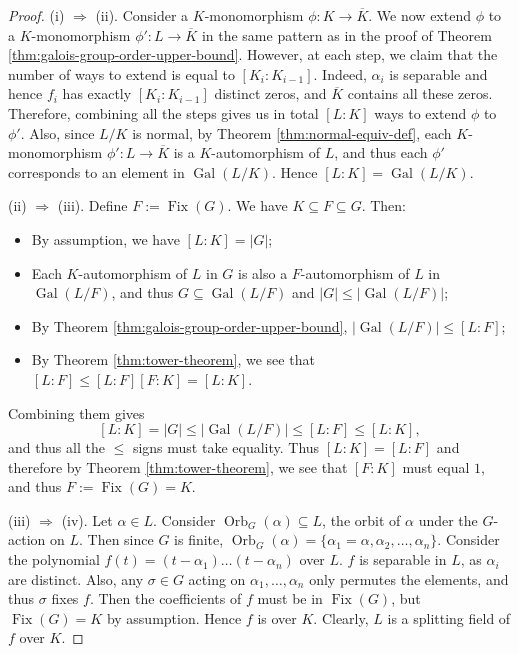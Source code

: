 \documentclass[12pt]{article}
\theoremstyle{definition}
\newcommand{\Gal}{\operatorname{Gal}}
\newcommand{\Fix}{\operatorname{Fix}}
\newcommand{\Orb}{\operatorname{Orb}}
\begin{document}

\begin{proof}
	
	
	
	(i) $\Rightarrow$ (ii). Consider a $K$-monomorphism $\phi: K \to \overline{K}$. We now extend $\phi$ to a $K$-monomorphism $\phi':L \to \overline{K}$ in the same pattern as in the proof of Theorem \ref{thm:galois-group-order-upper-bound}. However, at each step, we claim that the number of ways to extend is equal to $[K_i : K_{i-1}]$. Indeed, $\alpha_i$ is separable and hence $f_i$ has exactly $[K_i : K_{i-1}]$ distinct zeros, and $\overline K$ contains all these zeros. Therefore, combining all the steps gives us in total $[L:K]$ ways to extend $\phi$ to $\phi'$. Also, since $L/K$ is normal, by Theorem \ref{thm:normal-equiv-def}, each $K$-monomorphism $\phi': L \to \overline{K}$ is a $K$-automorphism of $L$, and thus each $\phi'$ corresponds to an element in $\Gal(L/K)$. Hence $[L:K] = \Gal(L/K)$. 
	
	(ii) $\Rightarrow$ (iii). Define $F:= \Fix(G)$. We have $K \subseteq F \subseteq G$. Then:
	\begin{itemize}
		\item By assumption, we have $[L:K] = |G|$;
		\item     Each $K$-automorphism of $L$ in $G$ is also a $F$-automorphism of $L$ in $\Gal(L/F)$, and thus $G \subseteq \Gal(L / F)$ and $|G| \le |\Gal(L / F)|$;
		\item  By Theorem \ref{thm:galois-group-order-upper-bound}, $|\Gal(L/F)| \le [L:F]$;
		
		\item     By Theorem \ref{thm:tower-theorem}, we see that $ [L:F] \le [L:F][F:K] = [L:K]$.
	\end{itemize}
	
	Combining them gives $$
	[L:K] = |G| \le |\Gal(L/F)| \le  [L:F] \le [L:K],
	$$    
	and thus all the $\le$ signs must take equality.  
	Thus $[L:K]=[L:F]$ and therefore by Theorem \ref{thm:tower-theorem}, we see that $[F:K]$ must equal $1$, and thus $F:=\Fix(G) = K$.
	
	(iii) $\Rightarrow$ (iv). Let $\alpha \in L$. Consider $\Orb_G(\alpha) \subseteq L$, the orbit of $\alpha$ under the $G$-action on $L$. Then since $G$ is finite, $\Orb_G(\alpha) = \{ \alpha_1 = \alpha, \alpha_2, \ldots, \alpha_n\}$. Consider the polynomial $f(t) = (t-\alpha_1) \ldots (t-\alpha_n)$ over $L$.  $f$ is separable in $L$, as $\alpha_i$ are distinct. Also, any $\sigma \in G$ acting on $\alpha_1, \dots, \alpha_n$ only permutes the elements, and thus $\sigma$ fixes $f$. Then the coefficients of $f$ must be in $\Fix(G)$, but $\Fix(G) = K$ by assumption. Hence $f$ is over $K$. Clearly, $L$ is a splitting field of $f$ over $K$. 
	

\end{proof}
\end{document}
